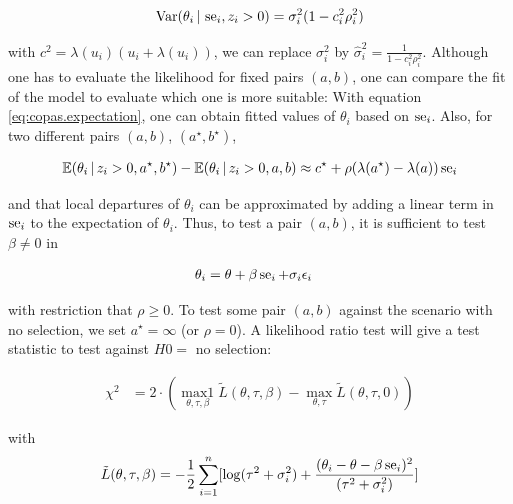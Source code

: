 \documentclass[11pt,a4paper,twoside]{book}\usepackage[]{graphicx}\usepackage[]{color}
\begin{document}
\begin{align}
\textrm{Var}(\theta_i\,\vert\, \operatorname{se}_i, z_i > 0) = \sigma_i^2 (1 - c_i^2\rho_i^2) \nonumber
\end{align}

with $c^2 = \lambda(u_i)(u_i + \lambda(u_i))$, we can replace $\sigma_i^2$ by $\hat{\sigma}_i^2 = \frac{1}{1-c_i^2\rho_i^2}$. Although one has to evaluate the likelihood for fixed pairs $(a,b)$, one can compare the fit of the model to evaluate which one is more suitable:
With equation \ref{eq:copas.expectation}, one can obtain fitted values of $\theta_i$ based on $\operatorname{se}_i$. Also, for two different pairs $(a,b)$, $(a^\star, b^\star)$,

\begin{align}
\mathbb{E}(\theta_i\,\vert\, z_i > 0, a^\star, b^\star) - \mathbb{E}(\theta_i\,\vert\, z_i > 0, a, b) \approx c^\star + \rho(\lambda(a^\star) - \lambda(a))\operatorname{se}_i \nonumber
\end{align}

and that local departures of $\theta_i$ can be approximated by adding a linear term in $\operatorname{se}_i$ to the expectation of $\theta_i$. Thus, to test a pair $(a,b)$, it is sufficient to test $\beta \neq 0$ in

\begin{align}
\theta_i &= \theta + \beta \operatorname{se}_i + \sigma_i \epsilon_i \nonumber
\end{align}

with restriction that $\rho \geq 0$. To test some pair $(a,b)$ against the scenario with no selection, we set $a^\star = \infty$ (or $\rho = 0$). A likelihood ratio test will give a test statistic to test against $H0 =$ no selection:

\begin{align}
\chi^2 &= 2\cdot(\operatorname*{max1}_{\theta, \tau, \beta}\tilde{L}(\theta, \tau, \beta) - \operatorname*{max}_{\theta, \tau}\tilde{L}(\theta, \tau, 0)) \label{eq:copas.small.study}
\end{align}

with 
\begin{align}
\tilde{L}(\theta, \tau, \beta) = -\frac{1}{2}\sum_{i = 1}^n[\log(\tau^2 + \sigma_i^2) + \frac{(\theta_i - \theta - \beta \operatorname{se}_i)^2}{(\tau^2 + \sigma_i^2)}] \nonumber
\end{align}
\end{document}
